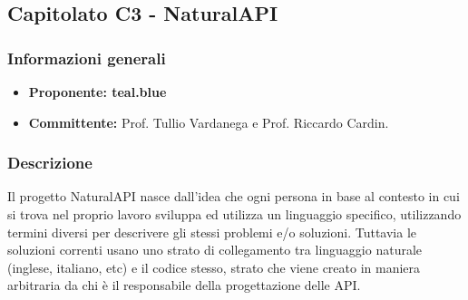 

    \subsection{Capitolato C3 - NaturalAPI}
       \subsubsection{Informazioni generali}
       \begin{itemize}
           \item \textbf{Proponente: teal.blue}
           \item \textbf{Committente: }Prof. Tullio Vardanega e Prof. Riccardo Cardin.
       \end{itemize}

    \subsubsection{Descrizione}
 		Il progetto NaturalAPI nasce dall'idea che ogni persona in base al contesto in cui si trova nel proprio lavoro sviluppa ed utilizza un linguaggio specifico, utilizzando termini diversi per descrivere gli stessi problemi e/o soluzioni. Tuttavia le soluzioni correnti usano uno strato di collegamento tra linguaggio naturale (inglese, italiano, etc) e il codice stesso, strato che viene creato in maniera arbitraria da chi è il responsabile della progettazione delle API.
